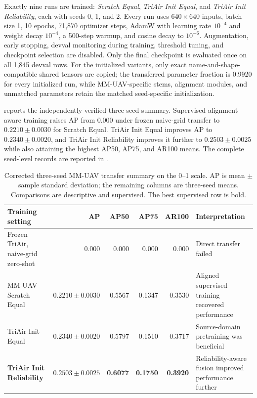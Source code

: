 Exactly nine runs are trained: \textit{Scratch Equal}, \textit{TriAir Init Equal}, and \textit{TriAir Init Reliability}, each with seeds 0, 1, and 2. Every run uses $640\times640$ inputs, batch size 1, 10 epochs, 71,870 optimizer steps, AdamW with learning rate $10^{-4}$ and weight decay $10^{-4}$, a 500-step warmup, and cosine decay to $10^{-6}$. Augmentation, early stopping, devval monitoring during training, threshold tuning, and checkpoint selection are disabled. Only the final checkpoint is evaluated once on all 1,845 devval rows. For the initialized variants, only exact name-and-shape-compatible shared tensors are copied; the transferred parameter fraction is 0.9920 for every initialized run, while MM-UAV-specific stems, alignment modules, and unmatched parameters retain the matched seed-specific initialization.

 reports the independently verified three-seed summary. Supervised alignment-aware training raises AP from 0.000 under frozen naive-grid transfer to $0.2210\pm0.0030$ for Scratch Equal. TriAir Init Equal improves AP to $0.2340\pm0.0020$, and TriAir Init Reliability improves it further to $0.2503\pm0.0025$ while also attaining the highest AP50, AP75, and AR100 means. The complete seed-level records are reported in .

\begin{table}[t]
\centering
\caption{Corrected three-seed MM-UAV transfer summary on the 0--1 scale. AP is mean $\pm$ sample standard deviation; the remaining columns are three-seed means. Comparisons are descriptive and supervised. The best supervised row is bold.}
\label{tab:mmuav-transfer}
\scriptsize
\begin{tabularx}{\textwidth}{@{}YrrrrY@{}}
\toprule
Training setting & AP & AP50 & AP75 & AR100 & Interpretation\\
\midrule
Frozen TriAir, naive-grid zero-shot & 0.000 & 0.000 & 0.000 & 0.000 & Direct transfer failed\\
MM-UAV Scratch Equal & $0.2210\pm0.0030$ & 0.5567 & 0.1347 & 0.3530 & Aligned supervised training recovered performance\\
TriAir Init Equal & $0.2340\pm0.0020$ & 0.5797 & 0.1510 & 0.3717 & Source-domain pretraining was beneficial\\
\textbf{TriAir Init Reliability} & $\mathbf{0.2503\pm0.0025}$ & \textbf{0.6077} & \textbf{0.1750} & \textbf{0.3920} & Reliability-aware fusion improved performance further\\
\bottomrule
\end{tabularx}
\end{table}

